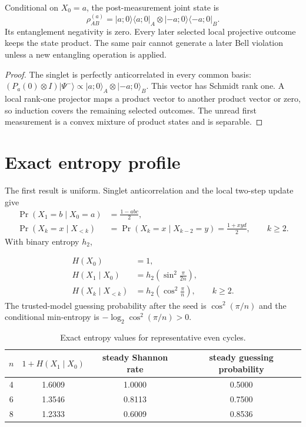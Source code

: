 \documentclass[11pt,a4paper]{article}
\begin{document}
\begin{theorem}
Conditional on $X_0=a$, the post-measurement joint state is
\begin{equation}
\rho_{AB}^{(a)}=|a;0\rangle\langle a;0|_A\otimes|-a;0\rangle\langle-a;0|_B.
\end{equation}
Its entanglement negativity is zero. Every later selected local projective outcome keeps the state product. The same pair cannot generate a later Bell violation unless a new entangling operation is applied.
\end{theorem}
\begin{proof}
The singlet is perfectly anticorrelated in every common basis:
$(P_a(0)\otimes I)|\Psi^-\rangle\propto|a;0\rangle_A\otimes|-a;0\rangle_B$. This vector has Schmidt rank one. A local rank-one projector maps a product vector to another product vector or zero, so induction covers the remaining selected outcomes. The unread first measurement is a convex mixture of product states and is separable.
\end{proof}

\section{Exact entropy profile}
The first result is uniform. Singlet anticorrelation and the local two-step update give
\begin{align}
\Pr(X_1=b\mid X_0=a)&=\frac{1-abc}{2},\\
\Pr(X_k=x\mid X_{<k})&=\Pr(X_k=x\mid X_{k-2}=y)=\frac{1+xyd}{2},\qquad k\ge2.
\end{align}
With binary entropy $h_2$,
\begin{theorem}
\begin{align}
H(X_0)&=1,\\
H(X_1\mid X_0)&=h_2\!\left(\sin^2\frac{\pi}{2n}\right),\\
H(X_k\mid X_{<k})&=h_2\!\left(\cos^2\frac{\pi}{n}\right),\qquad k\ge2.
\end{align}
The trusted-model guessing probability after the seed is $\cos^2(\pi/n)$ and the conditional min-entropy is $-\log_2\cos^2(\pi/n)>0$.
\end{theorem}

\begin{table}[H]
\centering
\caption{Exact entropy values for representative even cycles.}
\begin{tabular}{cccc}
\toprule
$n$ & $1+H(X_1\mid X_0)$ & steady Shannon rate & steady guessing probability\\
\midrule
4 & 1.6009 & 1.0000 & 0.5000\\
6 & 1.3546 & 0.8113 & 0.7500\\
8 & 1.2333 & 0.6009 & 0.8536\\
\bottomrule
\end{tabular}
\end{table}
\end{document}
